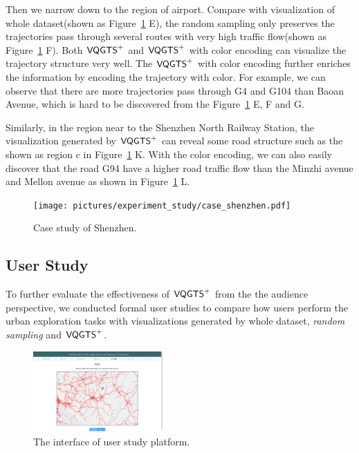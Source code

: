 Then we narrow down to the region of airport. Compare with visualization of whole dataset(shown as Figure~\ref{fig:shenzhen} E), the random sampling only preserves the trajectories pass through several routes with very high traffic flow(shown as Figure~\ref{fig:shenzhen} F).  Both $\mathsf{VQGTS}^{+}$ and $\mathsf{VQGTS}^{+}$ with color encoding can visualize the trajectory structure very well. The $\mathsf{VQGTS}^{+}$ with color encoding further enriches the information by encoding the trajectory with color. For example, we can observe that there are more trajectories pass through G4 and G104 than Baoan Avenue, which is hard to be discovered from the Figure~\ref{fig:shenzhen} E, F and G.  

Similarly, in the region near to the Shenzhen North Railway Station, the visualization generated by $\mathsf{VQGTS}^{+}$ can reveal some road structure such as the  shown as region c in Figure~\ref{fig:shenzhen} K. With the color encoding, we can also easily discover that the road G94 have a higher road traffic flow than the Minzhi avenue and Mellon avenue as shown in Figure~\ref{fig:shenzhen} L.

\begin{figure}[t]
	\centering
	\vspace{2mm}
	\texttt{[image: pictures/experiment\_study/case\_shenzhen.pdf]}
	\caption{Case study of Shenzhen.}
	\vspace{0mm}
	\label{fig:shenzhen}
\end{figure}


\subsection{User Study}
To further evaluate the effectiveness of $\mathsf{VQGTS}^{+}$ from the the audience perspective, we conducted formal user studies to compare how users perform the urban exploration tasks with visualizations generated by whole dataset, \textit{random sampling} and $\mathsf{VQGTS}^{+}$.


\begin{figure}[t]
	\centering
	\includegraphics[width=0.44\textwidth]{pictures/user_study/interface.jpg}
	\vspace{-3mm}
	\caption{The interface of user study platform.}
	\vspace{-5mm}
	\label{fig:user_study}
\end{figure}

